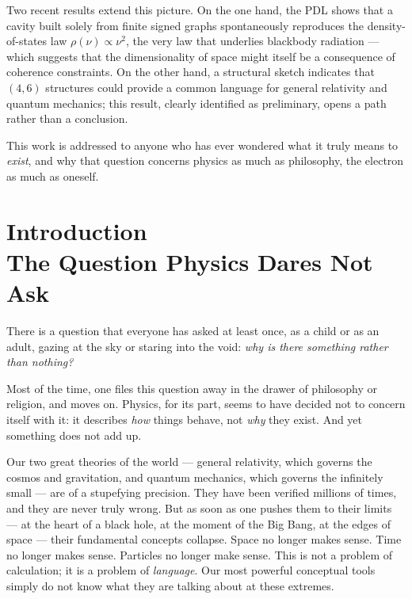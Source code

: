 \documentclass[11pt, a4paper, openright]{book}
\begin{document}
\medskip

Two recent results extend this picture. On the one hand, the PDL shows that a cavity built solely from finite signed graphs spontaneously reproduces the density-of-states law $\rho(\nu) \propto \nu^2$, the very law that underlies blackbody radiation --- which suggests that the dimensionality of space might itself be a consequence of coherence constraints. On the other hand, a structural sketch indicates that $(4,6)$ structures could provide a common language for general relativity and quantum mechanics; this result, clearly identified as preliminary, opens a path rather than a conclusion.

\medskip

This work is addressed to anyone who has ever wondered what it truly means to \emph{exist}, and why that question concerns physics as much as philosophy, the electron as much as oneself.

\newpage

\chapter*{Introduction \\ The Question Physics Dares Not Ask}

There is a question that everyone has asked at least once, as a child or as an adult, gazing at the sky or staring into the void: \emph{why is there something rather than nothing?}

\medskip

Most of the time, one files this question away in the drawer of philosophy or religion, and moves on. Physics, for its part, seems to have decided not to concern itself with it: it describes \emph{how} things behave, not \emph{why} they exist. And yet something does not add up.

\medskip

Our two great theories of the world --- general relativity, which governs the cosmos and gravitation, and quantum mechanics, which governs the infinitely small --- are of a stupefying precision. They have been verified millions of times, and they are never truly wrong. But as soon as one pushes them to their limits --- at the heart of a black hole, at the moment of the Big Bang, at the edges of space --- their fundamental concepts collapse. Space no longer makes sense. Time no longer makes sense. Particles no longer make sense. This is not a problem of calculation; it is a problem of \emph{language}. Our most powerful conceptual tools simply do not know what they are talking about at these extremes.
\end{document}
